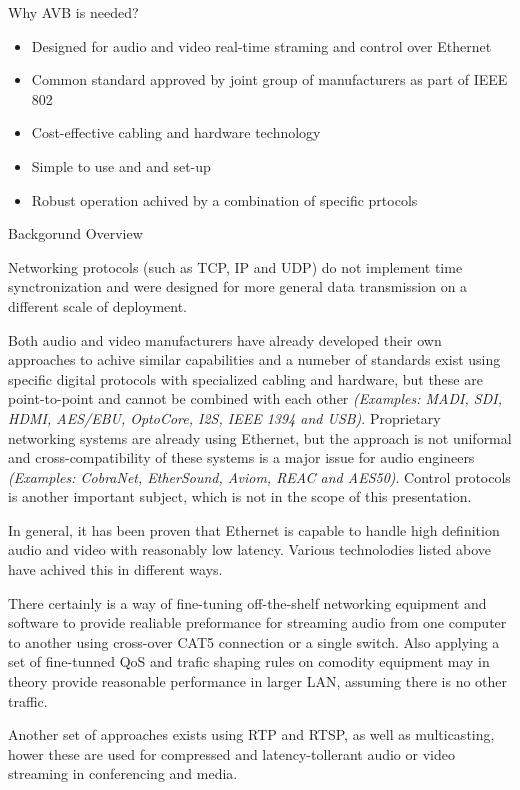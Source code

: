 { Why AVB is needed? }

\begin{itemize}
	\item Designed for audio and video real-time straming and control over Ethernet
	\item Common standard approved by joint group of manufacturers as part of IEEE 802
	\item Cost-effective cabling and hardware technology
	\item Simple to use and and set-up
	\item Robust operation achived by a combination of specific prtocols
\end{itemize}

{ Backgorund Overview }

Networking protocols (such as TCP, IP and UDP) do not implement time synctronization and
were designed for more general data transmission on a different scale of deployment.

Both audio and video manufacturers have already developed their own approaches to achive
similar capabilities and a numeber of standards exist using specific digital protocols with
specialized cabling and hardware, but these are point-to-point and cannot be combined with each other
\emph{(Examples: MADI, SDI, HDMI, AES/EBU, OptoCore, I2S, IEEE 1394 and USB)}.
Proprietary networking systems are already using Ethernet, but the approach is not uniformal
and cross-compatibility of these systems is a major issue for audio engineers
\emph{(Examples: CobraNet, EtherSound, Aviom, REAC and AES50)}.
Control protocols is another important subject, which is not in the scope of this presentation.

In general, it has been proven that Ethernet is capable to handle high definition audio and video
with reasonably low latency. Various technolodies listed above have achived this in different ways.

There certainly is a way of fine-tuning off-the-shelf networking equipment and software to provide
realiable preformance for streaming audio from one computer to another using cross-over CAT5 connection
or a single switch. Also applying a set of fine-tunned QoS and trafic shaping rules on comodity
equipment may in theory provide reasonable performance in larger LAN, assuming there is no other traffic.

Another set of approaches exists using RTP and RTSP, as well as multicasting, hower these
are used for compressed and latency-tollerant audio or video streaming in conferencing and media.



